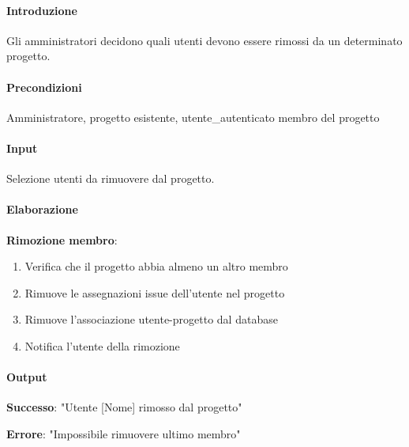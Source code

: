 \begin{reqbox}[title=REQ-FUN-08: Rimuovi Membri Progetto (solo Admin)]
\label{subsubsec:req-gestisci-membri}

\paragraph{Introduzione}
Gli amministratori decidono quali utenti devono essere rimossi da un determinato progetto.

\paragraph{Precondizioni}
Amministratore, progetto esistente, utente\_autenticato membro del progetto

\paragraph{Input}
Selezione utenti da rimuovere dal progetto.

\paragraph{Elaborazione}

\textbf{Rimozione membro}:
\begin{enumerate}[leftmargin=1.1em]
\item Verifica che il progetto abbia almeno un altro membro
\item Rimuove le assegnazioni issue dell'utente nel progetto
\item Rimuove l'associazione utente-progetto dal database
\item Notifica l'utente della rimozione
\end{enumerate}

\paragraph{Output}
\textbf{Successo}: "Utente [Nome] rimosso dal progetto"

\textbf{Errore}: "Impossibile rimuovere ultimo membro"

\end{reqbox}

\vspace{0.5cm}

\newpage


